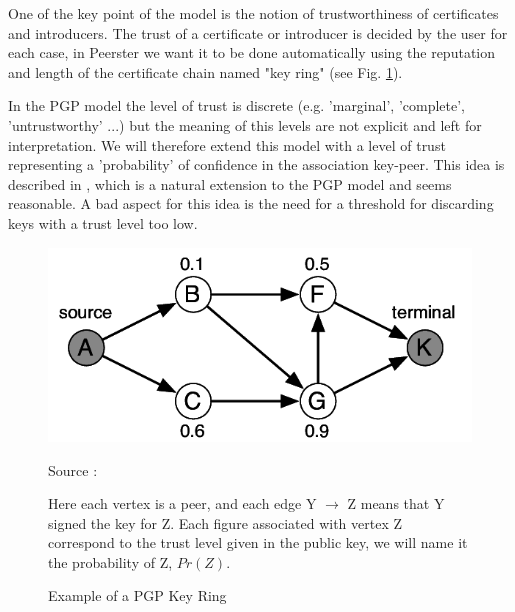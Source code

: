 \documentclass[]{article}
\begin{document}
            One of the key point of the model is the notion of trustworthiness of certificates and introducers. The trust of a certificate or introducer is decided by the user for each case, in Peerster we want it to be done automatically using the reputation and length of the certificate chain named "key ring" (see Fig. \ref{fig:pgp-key-ring}).
            
            In the PGP model the level of trust is discrete (e.g. 'marginal', 'complete', 'untrustworthy' ...) but the meaning of this levels are not explicit and left for interpretation. We will therefore extend this model with a level of trust representing a 'probability' of confidence in the association key-peer. This idea is described in \cite{haenni2007new}, which is a natural extension to the PGP model and seems reasonable.
            A bad aspect for this idea is the need for a threshold for discarding keys with a trust level too low.
            
            \begin{figure}[h]
                \includegraphics{pgp-key-ring}
                \centering
                \caption{Example of a PGP Key Ring}
                \label{fig:pgp-key-ring}
                Source : \cite{haenni2007new}
                
                Here each vertex is a peer, and each edge Y $\rightarrow$ Z means that Y signed the key for Z.
                Each figure associated with vertex Z  correspond to the trust level given in the public key, we will name it the probability of Z, $Pr(Z)$.
            \end{figure}
            
\end{document}
